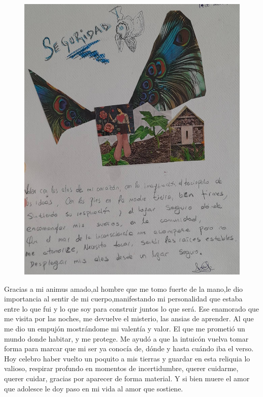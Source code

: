 \documentclass[12pt, a4paper, twoside]{book} %
\begin{document}
\begin{figure}[H]
	\centering
	\includegraphics[width=\textwidth]{./images/1f81324df158d6.jpg}
\end{figure}

Gracias a mi animus amado,al hombre que me tomo fuerte de la mano,le dio importancia al sentir de mi cuerpo,manifestando mi personalidad que estaba entre lo que fui y lo que soy para construir juntos lo que será.
Ese enamorado que me visita por las noches, me devuelve el misterio, las ansias de aprender.
Al que me dio un empujón mostrándome mi valentía y valor.
El que me prometió un mundo donde habitar, y me protege.
Me ayudó a que la intuicón vuelva tomar forma para marcar que mi ser ya conocía de, dónde y hasta cuándo iba el verso.
Hoy celebro haber vuelto un poquito a mis tierras y guardar en esta reliquia lo valioso, respirar profundo en momentos de incertidumbre, querer cuidarme, querer cuidar, gracias por aparecer de forma material.
Y si bien muere el amor que adolesce le doy paso en mi vida al amor que sostiene.

\chapter{}
\end{document}
